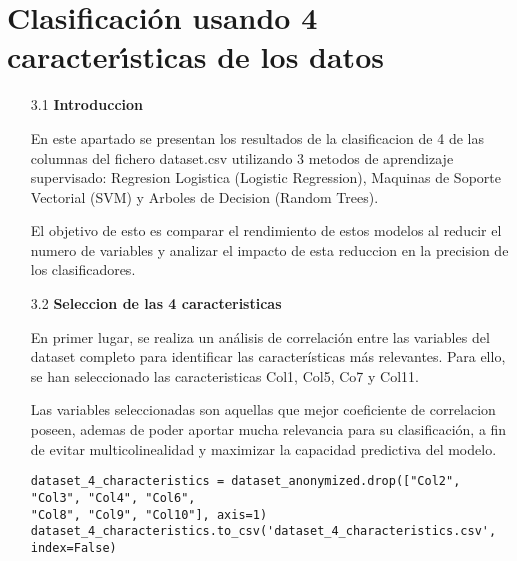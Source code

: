 \documentclass{article}
\begin{document}

\newpage

\section[3]{Clasificaci\'on usando 4 caracter\'{\i}sticas de los datos}

\begin{itemize}

\item[3.1]  {\bf Introduccion}

En este apartado se presentan los resultados de la clasificacion de 4 de las columnas del fichero dataset.csv utilizando 3 metodos de aprendizaje supervisado: Regresion Logistica (Logistic Regression), Maquinas de Soporte Vectorial (SVM) y Arboles de Decision (Random Trees).

El objetivo de esto es comparar el rendimiento de estos modelos al reducir el numero de variables y analizar el impacto de esta reduccion en la precision de los clasificadores.

\end{itemize}

\bigskip

\begin{itemize}

\item[3.2]  {\bf Seleccion de las 4 caracteristicas}

En primer lugar, se realiza un análisis de correlación entre las variables del dataset completo para identificar las características más relevantes. Para ello, se han seleccionado las caracteristicas Col1, Col5, Co7 y Col11.

Las variables seleccionadas son aquellas que mejor coeficiente de correlacion poseen, ademas de poder aportar mucha relevancia para su clasificación, a fin de evitar multicolinealidad y maximizar la capacidad predictiva del modelo.

\begin{tcolorbox}[width=14cm]
\begin{scriptsize}
\begin{verbatim}
dataset_4_characteristics = dataset_anonymized.drop(["Col2", "Col3", "Col4", "Col6",
"Col8", "Col9", "Col10"], axis=1)
dataset_4_characteristics.to_csv('dataset_4_characteristics.csv', index=False)
\end{verbatim}
\end{scriptsize}
\end{tcolorbox}

\end{itemize}
\end{document}
